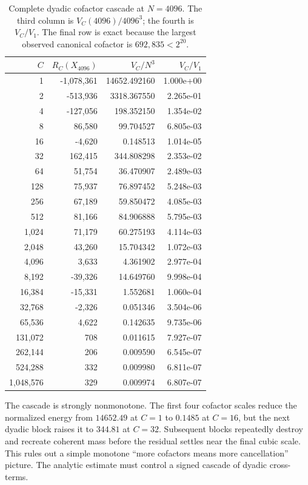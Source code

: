\documentclass[11pt]{article}
\theoremstyle{definition}
\newcommand{\1}{\mathbf{1}}
\begin{document}
\begin{table}[htbp]
\centering
\caption{Complete dyadic cofactor cascade at $N=4096$.  The third column is $V_C(4096)/4096^3$; the fourth is $V_C/V_1$.  The final row is exact because the largest observed canonical cofactor is $692{,}835<2^{20}$.}
\label{tab:cofactor-cascade}
\scriptsize
\setlength{\tabcolsep}{7pt}
\begin{tabular}{rrrr}
\toprule
$C$ & $R_C(X_{4096})$ & $V_C/N^3$ & $V_C/V_1$\\
\midrule
1 & -1,078,361 & 14652.492160 & 1.000e+00 \\
2 & -513,936 & 3318.367550 & 2.265e-01 \\
4 & -127,056 & 198.352150 & 1.354e-02 \\
8 & 86,580 & 99.704527 & 6.805e-03 \\
16 & -4,620 & 0.148513 & 1.014e-05 \\
32 & 162,415 & 344.808298 & 2.353e-02 \\
64 & 51,754 & 36.470907 & 2.489e-03 \\
128 & 75,937 & 76.897452 & 5.248e-03 \\
256 & 67,189 & 59.850472 & 4.085e-03 \\
512 & 81,166 & 84.906888 & 5.795e-03 \\
1,024 & 71,179 & 60.275193 & 4.114e-03 \\
2,048 & 43,260 & 15.704342 & 1.072e-03 \\
4,096 & 3,633 & 4.361902 & 2.977e-04 \\
8,192 & -39,326 & 14.649760 & 9.998e-04 \\
16,384 & -15,331 & 1.552681 & 1.060e-04 \\
32,768 & -2,326 & 0.051346 & 3.504e-06 \\
65,536 & 4,622 & 0.142635 & 9.735e-06 \\
131,072 & 708 & 0.011615 & 7.927e-07 \\
262,144 & 206 & 0.009590 & 6.545e-07 \\
524,288 & 332 & 0.009980 & 6.811e-07 \\
1,048,576 & 329 & 0.009974 & 6.807e-07 \\
\bottomrule
\end{tabular}
\end{table}

The cascade is strongly nonmonotone.  The first four cofactor scales reduce the normalized energy from $14652.49$ at $C=1$ to $0.1485$ at $C=16$, but the next dyadic block raises it to $344.81$ at $C=32$. Subsequent blocks repeatedly destroy and recreate coherent mass before the residual settles near the final cubic scale.  This rules out a simple monotone ``more cofactors means more cancellation'' picture. The analytic estimate must control a signed cascade of dyadic cross-terms.
\end{document}
